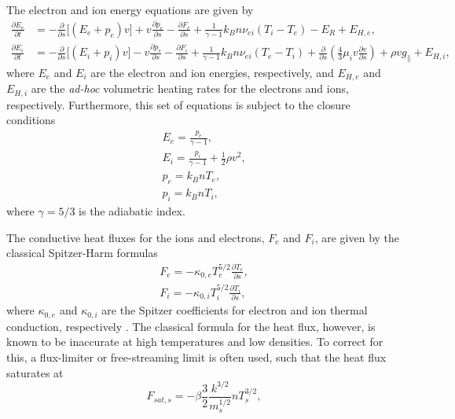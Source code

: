 %
\par The electron and ion energy equations are given by
\begin{align}
	\frac{\partial E_e}{\partial t} &= -\frac{\partial}{\partial s} \lbrack(E_e+p_e)v\rbrack+v\frac{\partial p_e}{\partial s} - \frac{\partial F_{e}}{\partial s} + \frac{1}{\gamma - 1}k_Bn\nu_{ei}(T_i-T_e) -E_R+E_{H,e}, \label{eq:1denergy_e} \\[0.5em]
	\frac{\partial E_i}{\partial t} &= -\frac{\partial }{\partial s}\lbrack(E_i+p_i)v\rbrack-v\frac{\partial p_e}{\partial s} - \frac{\partial F_{i}}{\partial s} + \frac{1}{\gamma - 1}k_Bn\nu_{ei}(T_e-T_i) + \frac{\partial}{\partial s}\left(\frac{4}{3}\mu_iv\frac{\partial v}{\partial s}\right) +\rho v g_{\parallel} + E_{H,i},\label{eq:1denergy_i}
\end{align}
where $E_e$ and $E_i$ are the electron and ion energies, respectively, and $E_{H,e}$ and $E_{H,i}$ are the \textit{ad-hoc} volumetric heating rates for the electrons and ions, respectively. Furthermore, this set of equations is subject to the closure conditions
\begin{align}
	E_e = \frac{p_e}{\gamma - 1}, \label{eq:ee_close} \\[0.5em]
	E_i = \frac{p_i}{\gamma - 1} + \frac{1}{2}\rho v^2, \label{eq:ei_close} \\[0.5em]
	p_e = k_BnT_e, \label{eq:pe_close} \\[0.5em]
	p_i = k_BnT_i, \label{eq:pi_close}
\end{align}
where $\gamma=5/3$ is the adiabatic index.
% 
\par The conductive heat fluxes for the ions and electrons, $F_{e}$ and $F_{i}$, are given by the classical Spitzer-Harm \citep{spitzer_transport_1953} formulas
\begin{align}
	F_{e}=-\kappa_{0,e}T_e^{5/2}\frac{\partial T_e}{\partial s}, \label{eq:1dhfluxe} \\[0.5em]
	F_{i}=-\kappa_{0,i}T_i^{5/2}\frac{\partial T_i}{\partial s}, \label{eq:1dhfluxi}
\end{align}
where $\kappa_{0,e}$ and $\kappa_{0,i}$ are the Spitzer coefficients for electron and ion thermal conduction, respectively \citep{bradshaw_influence_2013}. The classical formula for the heat flux, however, is known to be inaccurate at high temperatures and low densities. To correct for this, a flux-limiter or free-streaming limit is often used, such that the heat flux saturates at
\begin{equation}
	F_{sat,s} = -\beta\frac{3}{2}\frac{k^{3/2}}{m_s^{1/2}}nT_s^{3/2},
\end{equation}
